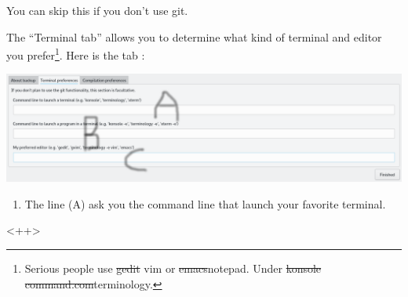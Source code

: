 \documentclass[a4paper,12pt]{article}
\begin{document}
You can skip this if you don't use git. 

The ``Terminal tab'' allows you to determine what kind of terminal and editor you prefer\footnote{Serious people use \sout{gedit} vim or \sout{emacs}notepad. Under \sout{konsole}\,\sout{command.com}terminology.}.
Here is the tab :

\begin{center}
    \includegraphics[width=\linewidth]{terminal_tab.png}
\end{center}
\begin{enumerate}
    \item
        The line (A) ask you the command line that launch your favorite terminal.
\end{enumerate}
<++>
\end{document}
